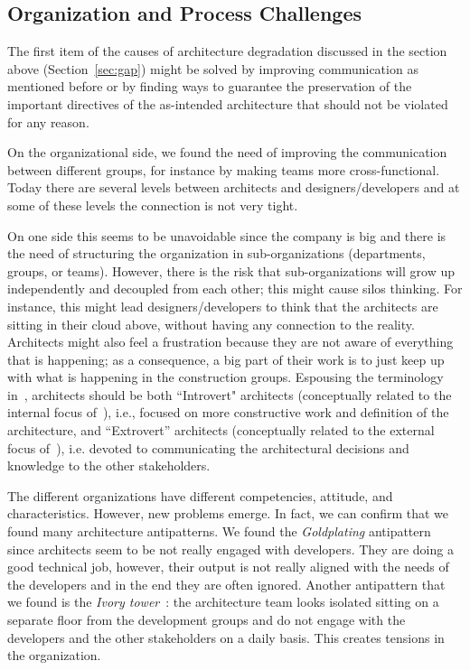 \subsection{Organization and Process Challenges}\label{sec:organizationAndProcessChallenges}
The first item of the causes of architecture degradation discussed in the section above (Section~\ref{sec:gap}) might be solved by improving communication as mentioned before or by finding ways to guarantee the preservation of the  important directives of the as-intended architecture that should not be violated for any reason.

On the organizational side, we found the need of improving the communication between
different groups, for instance by making teams more cross-functional. Today
there are several levels between architects and designers/developers and at some of
these levels the connection is not very tight. 

On one side this seems to be unavoidable since the company is 
big and there is the need of structuring the organization in sub-organizations (departments, groups, or teams). 
However, there is the risk that sub-organizations will grow up independently and decoupled from each other; this might 
cause silos thinking.  
For instance, this might lead designers/developers to think
that the architects are sitting in their cloud above, without having
any connection to the reality. Architects might also feel
a frustration because they are not aware of everything that is happening; as a
consequence, a big part of their work is to just keep up with what is happening
in the construction groups. Espousing the terminology
in~\cite{IEEESoftwarePatrizio,whatindustrywants}, architects should be both ``Introvert" architects (conceptually related to the internal focus
of~\cite{Kruchten2008}), i.e., focused on more constructive work and definition of the architecture,
and 
``Extrovert'' architects (conceptually related to the external focus
of~\cite{Kruchten2008}), i.e. devoted to communicating the architectural
decisions and knowledge to the other stakeholders. 

The different organizations have different competencies, attitude, and
characteristics. However, new problems emerge. In fact, we can confirm that we
found many architecture antipatterns. We found the {\em Goldplating}
antipattern~\cite{Kruchten2008} since architects seem to be not
really engaged with developers. They are doing a good technical job, however,
their output is not really aligned with the needs of the developers and in the
end they are often ignored. Another antipattern that we found is the {\em Ivory
tower}~\cite{Kruchten2008}: the architecture team looks isolated
sitting on a separate floor from the development groups and do not engage with the
developers and the other stakeholders on a daily basis. This creates tensions in
the organization. 

